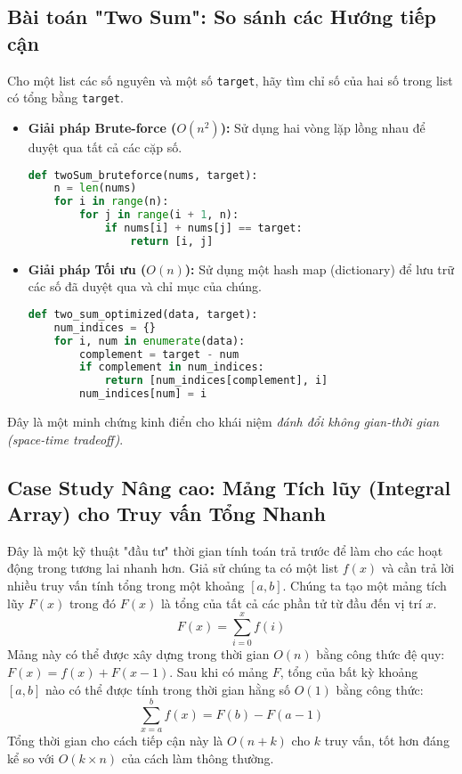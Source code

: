\documentclass[11pt]{article}
\begin{document}
\subsection{Bài toán "Two Sum": So sánh các Hướng tiếp cận}
Cho một list các số nguyên và một số \texttt{target}, hãy tìm chỉ số của hai số trong list có tổng bằng \texttt{target}.
\begin{itemize}
    \item \textbf{Giải pháp Brute-force ($O(n^2)$):} Sử dụng hai vòng lặp lồng nhau để duyệt qua tất cả các cặp số.
    \begin{lstlisting}[language=Python]
def twoSum_bruteforce(nums, target):
    n = len(nums)
    for i in range(n):
        for j in range(i + 1, n):
            if nums[i] + nums[j] == target:
                return [i, j]
    \end{lstlisting}
    \item \textbf{Giải pháp Tối ưu ($O(n)$):} Sử dụng một hash map (dictionary) để lưu trữ các số đã duyệt qua và chỉ mục của chúng.
    \begin{lstlisting}[language=Python]
def two_sum_optimized(data, target):
    num_indices = {}
    for i, num in enumerate(data):
        complement = target - num
        if complement in num_indices:
            return [num_indices[complement], i]
        num_indices[num] = i
    \end{lstlisting}
\end{itemize}
Đây là một minh chứng kinh điển cho khái niệm \textit{đánh đổi không gian-thời gian (space-time tradeoff)}.

\subsection{Case Study Nâng cao: Mảng Tích lũy (Integral Array) cho Truy vấn Tổng Nhanh}
Đây là một kỹ thuật "đầu tư" thời gian tính toán trả trước để làm cho các hoạt động trong tương lai nhanh hơn.
Giả sử chúng ta có một list $f(x)$ và cần trả lời nhiều truy vấn tính tổng trong một khoảng $[a, b]$.
Chúng ta tạo một mảng tích lũy $F(x)$ trong đó $F(x)$ là tổng của tất cả các phần tử từ đầu đến vị trí $x$.
\[ F(x)=\sum_{i=0}^{x}f(i) \]
Mảng này có thể được xây dựng trong thời gian $O(n)$ bằng công thức đệ quy: $F(x) = f(x) + F(x-1)$.
Sau khi có mảng $F$, tổng của bất kỳ khoảng $[a, b]$ nào có thể được tính trong thời gian hằng số $O(1)$ bằng công thức:
\[ \sum_{x=a}^{b}f(x)=F(b)-F(a-1) \]
Tổng thời gian cho cách tiếp cận này là $O(n+k)$ cho $k$ truy vấn, tốt hơn đáng kể so với $O(k \times n)$ của cách làm thông thường.
\end{document}
